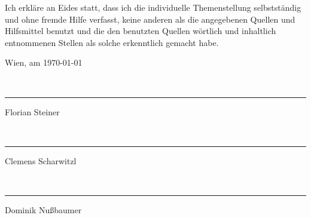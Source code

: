 
Ich erkläre an Eides statt, dass ich die individuelle Themenstellung
selbstständig und ohne fremde Hilfe verfasst, keine anderen als die
angegebenen Quellen und Hilfsmittel benutzt und die den benutzten
Quellen wörtlich und inhaltlich entnommenen Stellen als solche erkenntlich
gemacht habe.

\begin{flushleft}
\bigskip{}
Wien, am \today \\
\newcommand{\namesigdate}[2][8cm]{
\vspace{2cm}~\newline
\parbox{#1}{\hrule\centering #2\Large\strut}
\hfill
}
\namesigdate{Florian Steiner}
\namesigdate{Clemens Scharwitzl} 
\namesigdate{Dominik Nußbaumer}
\par\end{flushleft}

